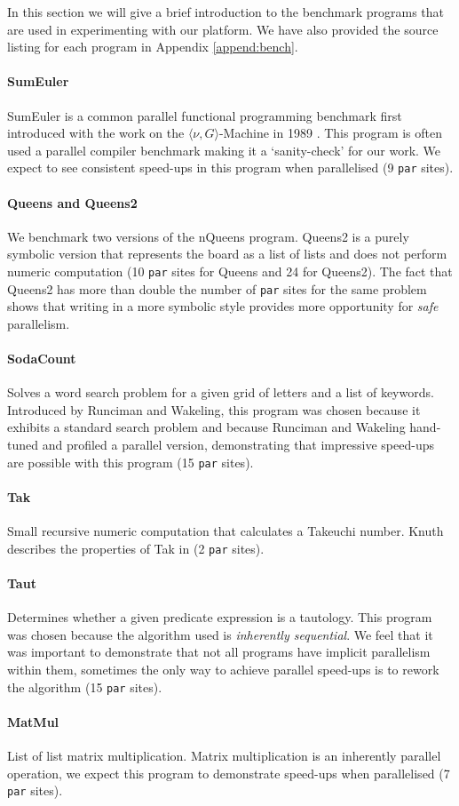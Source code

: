 In this section we will give a brief introduction to the benchmark programs
that are used in experimenting with our platform. We have also provided the source
listing for each program in Appendix \ref{append:bench}.

\paragraph{SumEuler}
SumEuler is a common parallel functional programming benchmark first introduced
with the work on the $\langle\nu, G\rangle$-Machine in 1989 \citep{vGMachine}.
This program is often used a parallel compiler benchmark making it a
`sanity-check' for our work. We expect to see consistent speed-ups in this
program when parallelised (9 \verb-par- sites).

\paragraph{Queens and Queens2}
We benchmark two versions of the nQueens program. Queens2 is a purely symbolic
version that represents the board as a list of lists and does not perform
numeric computation (10 \verb-par- sites for Queens and 24 for Queens2). The
fact that Queens2 has more than double the number of \verb-par- sites for the
same problem shows that writing in a more symbolic style provides more
opportunity for \emph{safe} parallelism.

\paragraph{SodaCount}
Solves a word search problem for a given grid of letters and a list of
keywords.  Introduced by Runciman and Wakeling, this program was chosen because
it exhibits a standard search problem and because Runciman and Wakeling
hand-tuned and profiled a parallel version, demonstrating that impressive
speed-ups are possible with this program \citep{Runciman:1996:AFP:242105} (15
\verb-par- sites).

\paragraph{Tak}
Small recursive numeric computation that calculates a Takeuchi number. Knuth
describes the properties of Tak in \citep{ExamplesOfRecursion} (2 \verb-par-
sites).

\paragraph{Taut}
Determines whether a given predicate expression is a tautology. This program
was chosen because the algorithm used is \emph{inherently sequential}. We feel
that it was important to demonstrate that not all programs have implicit
parallelism within them, sometimes the only way to achieve parallel speed-ups
is to rework the algorithm (15 \verb-par- sites).

\paragraph{MatMul}
List of list matrix multiplication. Matrix multiplication is an inherently
parallel operation, we expect this program to demonstrate speed-ups when
parallelised (7 \verb-par- sites).
